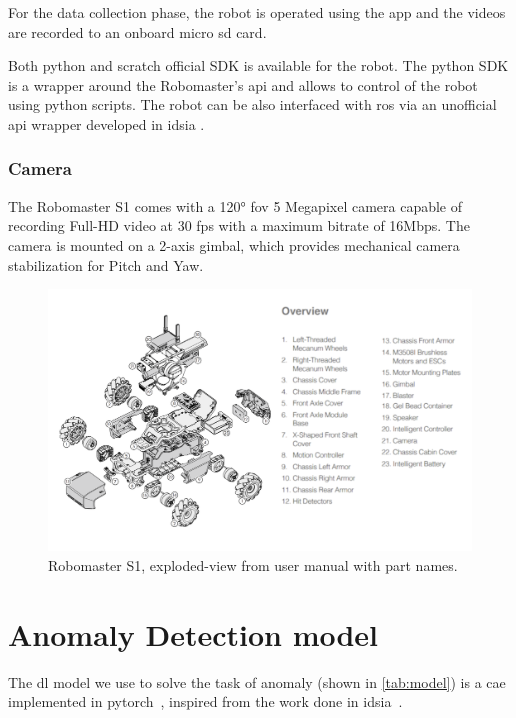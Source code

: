             For the data collection phase, the robot is operated using the app and the videos are recorded to an onboard micro sd card.

            Both python and scratch official SDK is available for the robot. The python SDK is a wrapper around the Robomaster's \acrshort{api} and allows to control of the robot using python scripts. The robot can be also interfaced with \acrfull{ros} via an unofficial \acrshort{api} wrapper developed in \acrshort{idsia} \cite{JeromeRobomaster}.

            
            \subsubsection*{Camera}
                The Robomaster S1 comes with a 120° \acrshort{fov} 5 Megapixel camera capable of recording Full-HD video at 30 \acrshort{fps} with a maximum bitrate of 16Mbps. The camera is mounted on a 2-axis gimbal, which provides mechanical camera stabilization for Pitch and Yaw.
                
            \begin{figure}[H]
                \centering
                \centerline{\includegraphics[width=\textwidth]{img/RM-exploded.png}}
                \caption{Robomaster S1, exploded-view from user manual with part names.}
                \label{fig:env-ex}
            \end{figure}
            
\section{Anomaly Detection model}
    
    The \acrshort{dl} model we use to solve the task of anomaly (shown in \autoref{tab:model}) is a \acrfull{cae} implemented in pytorch~\cite{pytorch}, inspired from the work done in \acrshort{idsia}~\cite{Idsia}.
    

